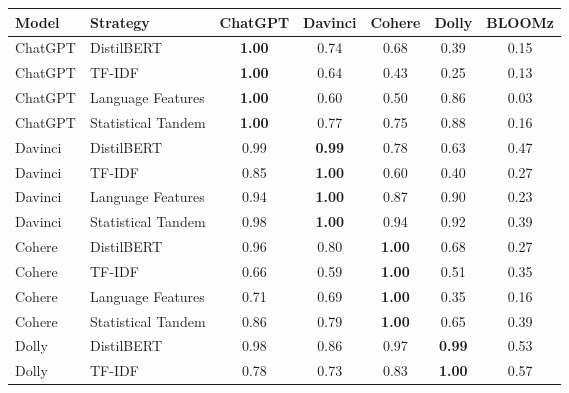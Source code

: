 \begin{table}[ht]
    \vspace{0.1cm}
    \centering
    \begin{tabular}{llccccc}
        \toprule
        Model   & Strategy           & ChatGPT       & Davinci       & Cohere        & Dolly         & BLOOMz        \\
        \midrule
        ChatGPT & DistilBERT         & \textbf{1.00} & 0.74          & 0.68          & 0.39          & 0.15          \\
        ChatGPT & TF-IDF             & \textbf{1.00} & 0.64          & 0.43          & 0.25          & 0.13          \\
        ChatGPT & Language Features  & \textbf{1.00} & 0.60          & 0.50          & 0.86          & 0.03          \\
        ChatGPT & Statistical Tandem & \textbf{1.00} & 0.77          & 0.75          & 0.88          & 0.16          \\
        Davinci & DistilBERT         & 0.99          & \textbf{0.99} & 0.78          & 0.63          & 0.47          \\
        Davinci & TF-IDF             & 0.85          & \textbf{1.00} & 0.60          & 0.40          & 0.27          \\
        Davinci & Language Features  & 0.94          & \textbf{1.00} & 0.87          & 0.90          & 0.23          \\
        Davinci & Statistical Tandem & 0.98          & \textbf{1.00} & 0.94          & 0.92          & 0.39          \\
        Cohere  & DistilBERT         & 0.96          & 0.80          & \textbf{1.00} & 0.68          & 0.27          \\
        Cohere  & TF-IDF             & 0.66          & 0.59          & \textbf{1.00} & 0.51          & 0.35          \\
        Cohere  & Language Features  & 0.71          & 0.69          & \textbf{1.00} & 0.35          & 0.16          \\
        Cohere  & Statistical Tandem & 0.86          & 0.79          & \textbf{1.00} & 0.65          & 0.39          \\
        Dolly   & DistilBERT         & 0.98          & 0.86          & 0.97          & \textbf{0.99} & 0.53          \\
        Dolly   & TF-IDF             & 0.78          & 0.73          & 0.83          & \textbf{1.00} & 0.57          \\

\end{tabular}
\end{table}
